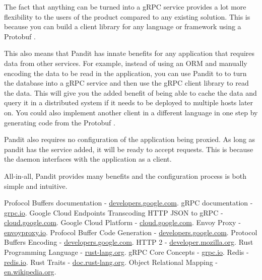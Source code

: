 \documentclass[a4paper]{article}
\begin{document}
The fact that anything can be turned into a gRPC service provides a lot more flexibility to the users of the product compared to any existing solution.
This is because you can build a client library for any language or framework using a Protobuf \cite{codegen}.

This also means that Pandit has innate benefits for any application that requires data from other services.
For example, instead of using an ORM \cite{orm} and manually encoding the data to be read in the application, you can use Pandit to
to turn the database into a gRPC service and then use the gRPC client library to read the data. This will give you the added benefit of
being able to cache the data and query it in a distributed system if it needs to be deployed to multiple hosts later on.
You could also implement another client in a different language in one step by generating code from the Protobuf \cite{codegen}.

Pandit also requires no configuration of the application being proxied. As long as pandit has the service added, it will be ready to accept requests.
This is because the daemon interfaces with the application as a client.

All-in-all, Pandit provides many benefits and the configuration process is both simple and intuitive.

\begin{thebibliography}{9}
    Profocol Buffers documentation - \href{https://developers.google.com/protocol-buffers}{developers.google.com}.
    gRPC documentation - \href{https://grpc.io/docs/}{grpc.io}.
    Google Cloud Endpoints Transcoding HTTP JSON to gRPC - \href{https://cloud.google.com/endpoints/docs/grpc/transcoding}{cloud.google.com}.
    Google Cloud Platform - \href{https://cloud.google.com/}{cloud.google.com}.
    Envoy Proxy - \href{https://www.envoyproxy.io/docs/envoy/latest/intro/arch_overview/arch_overview}{envoyproxy.io}.
    Profocol Buffer Code Generation - \href{https://developers.google.com/protocol-buffers/docs/reference/go-generated}{developers.google.com}.
    Protocol Buffers Encoding - \href{https://developers.google.com/protocol-buffers/docs/encoding}{developers.google.com}.
    HTTP 2 - \href{https://developer.mozilla.org/en-US/docs/Glossary/HTTP_2}{developer.mozilla.org}.
    Rust Programming Language - \href{https://www.rust-lang.org/}{rust-lang.org}.
    gRPC Core Concepts - \href{https://grpc.io/docs/what-is-grpc/core-concepts/}{grpc.io}.
    Redis - \href{https://redis.io/}{redis.io}.
    Rust Traits - \href{https://doc.rust-lang.org/rust-by-example/trait.html}{doc.rust-lang.org}.
    Object Relational Mapping - \href{https://en.wikipedia.org/wiki/Object%E2%80%93relational_mapping}{en.wikipedia.org}.
\end{thebibliography}
\end{document}
